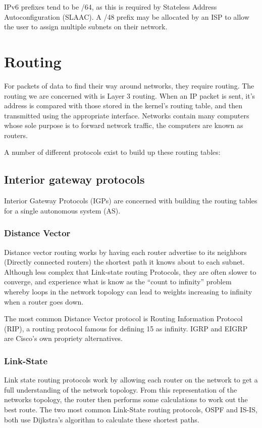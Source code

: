 \documentclass[12pt]{report}
\begin{document}
IPv6 prefixes tend to be /64, as this is required by Stateless Address 
Autoconfiguration (SLAAC). A /48 prefix may be allocated by an ISP to allow the user 
to assign multiple subnets on their network.

\section{Routing}
For packets of data to find their way around networks, they require
routing. The routing we are concerned with is Layer 3 routing. When an IP
packet is sent, it's address is compared with those stored in the kernel's
routing table, and then transmitted using the appropriate interface. Networks
contain many computers whose sole purpose is to forward network traffic, the
computers are known as routers. 

A number of different protocols exist to build up these routing tables:

\subsection{Interior gateway protocols}
Interior Gateway Protocols (IGPs) are concerned with building the routing
tables for a single autonomous system (AS). 

\subsubsection{Distance Vector}
Distance vector routing works by having each router advertise to its neighbors
(Directly connected routers) the shortest path it knows about to each subnet.
Although less complex that Link-state routing Protocols, they are often slower
to converge, and experience what is know as the ``count to infinity'' problem
whereby loops in the network topology can lead to weights increasing to
infinity when a router goes down. 

The most common Distance Vector protocol is Routing Information Protocol (RIP),
a routing protocol famous for defining 15 as infinity. IGRP and EIGRP are
Cisco's own propriety alternatives.

\subsubsection{Link-State}
Link state routing protocols work by allowing each router on the network to get
a full understanding of the network topology. From this representation of the
networks topology, the router then performs some calculations to work out the
best route. The two most common Link-State routing protocols, OSPF and IS-IS,
both use Dijkstra's algorithm to calculate these shortest paths. 
\end{document}
